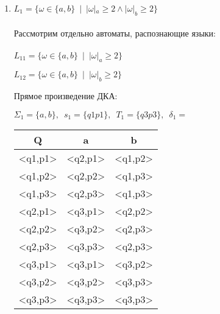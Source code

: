 \documentclass [a4paper, 14pt] {article} %
\begin{document}
\begin{enumerate}
    \item 
    $L_1 = \{\omega \in \{a,b\} \enspace | \enspace |\omega|_a \ge 2 \wedge |\omega|_b \ge 2\}$
    \\ \\
    Рассмотрим отдельно автоматы, распознающие языки:
    \\ \\
    $L_{11} = \{\omega \in \{a,b\} \enspace | \enspace |\omega|_a \ge 2\}$
    \begin{center}
    \end{center}
        
    $L_{12} = \{\omega \in \{a,b\} \enspace | \enspace |\omega|_b \ge 2\}$
    \begin{center}
    \end{center}
    
    Прямое произведение ДКА:
    
    $\Sigma_1 = \{a,b\}, \enspace s_1 = \{q1p1\}, \enspace T_1 = \{q3p3\}, \enspace \delta_1 =$
    \begin{center}
        \begin{tabular}{|c|c|c|}
            \hline
            Q       & a       & b       \\ \hline
            <q1,p1> & <q2,p1> & <q1,p2> \\ \hline
            <q1,p2> & <q2,p2> & <q1,p3> \\ \hline
            <q1,p3> & <q2,p3> & <q1,p3> \\ \hline
            <q2,p1> & <q3,p1> & <q2,p2> \\ \hline
            <q2,p2> & <q3,p2> & <q2,p3> \\ \hline
            <q2,p3> & <q3,p3> & <q2,p3>  \\ \hline
            <q3,p1> & <q3,p1> & <q3,p2> \\ \hline
            <q3,p2> & <q3,p2> & <q3,p3> \\ \hline
            <q3,p3> & <q3,p3> & <q3,p3> \\ \hline
        \end{tabular}
    \end{center}


\end{enumerate}
\end{document}

